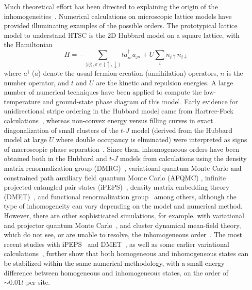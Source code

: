 \documentclass[12pt]{article}
\begin{document}
Much theoretical effort has been directed to explaining the origin of the
inhomogeneities~\cite{Fradkin2015}.  Numerical calculations on
microscopic lattice models have provided illuminating examples of the
possible orders.  The prototypical lattice model to understand HTSC is
the 2D Hubbard model on a square lattice, with the Hamiltonian
\begin{equation}
  H = -\sum_{\langle ij \rangle,\sigma \in \{\uparrow,\downarrow\}} t
  a^\dag_{i\sigma} a_{j\sigma} + U \sum_i n_{i\uparrow}
  n_{i\downarrow}
\end{equation}
where $a^{\dag}$ ($a$)  denote the usual fermion creation (annihilation) operators, $n$ is the number operator, and $t$ and $U$ are the kinetic
and repulsion energies. A large number of numerical techniques have
been applied to compute the low-temperature and ground-state phase
diagram of this model.
Early evidence for unidirectional stripe ordering in the Hubbard model
came from Hartree-Fock calculations~\cite{Poilblanc1989,Zaanen1989,machida89,schulz89},
whereas non-convex energy versus filling curves  in exact
diagonalization of small clusters of the $t$-$J$ model (derived from the Hubbard model at large $U$ where
double occupancy is eliminated)
were interpreted as signs of macroscopic phase separation~\cite{Emery1990,Emery1990a}.  Since then, inhomogeneous
orders have been obtained both in the Hubbard and $t$-$J$ models from calculations using the
density matrix renormalization group (DMRG)~\cite{white1998density,white2003stripes,hager2005stripe},
variational quantum Monte Carlo \cite{himeda02} and constrained path auxiliary field
quantum Monte Carlo (AFQMC) \cite{chang2010spin},
infinite projected entangled pair states
(iPEPS)~\cite{Corboz2014}, density matrix embedding theory
(DMET)~\cite{zheng2016}, and functional renormalization
group~\cite{yamase2016coexistence} among others, although the type of
inhomogeneity can vary depending on the model and numerical method.  %
However, there are other sophisticated simulations, for example, with
variational and projector quantum Monte Carlo~\cite{Sorella2002,hu12}, and
cluster dynamical mean-field theory, which do not see, or are unable to resolve, the inhomogeneous
order~\cite{macridin2006phase,LeBlanc2015}.  The most recent studies with
iPEPS~\cite{Corboz2014} and DMET~\cite{zheng2016}, as well as some
earlier variational calculations~\cite{himeda02,raczkowski07,chou08,chou10}, further show that both homogeneous
and inhomogeneous states can be stabilized within the
same numerical methodology, with a small energy difference between
homogeneous and inhomogeneous states, on the order of $\sim 0.01t$ per
site.
\end{document}
